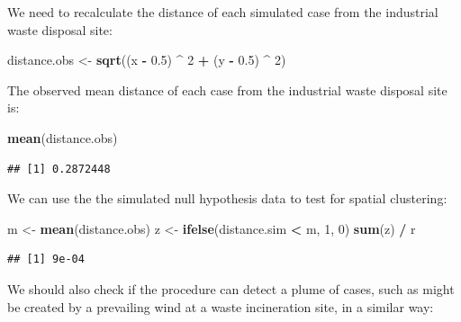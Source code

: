 \documentclass[12pt,a4paper]{book}
\newenvironment{Shaded}{\begin{snugshade}}{\end{snugshade}}
\newcommand{\DecValTok}[1]{\textcolor[rgb]{0.00,0.00,0.81}{#1}}
\newcommand{\FloatTok}[1]{\textcolor[rgb]{0.00,0.00,0.81}{#1}}
\newcommand{\KeywordTok}[1]{\textcolor[rgb]{0.13,0.29,0.53}{\textbf{#1}}}
\newcommand{\NormalTok}[1]{#1}
\newcommand{\OperatorTok}[1]{\textcolor[rgb]{0.81,0.36,0.00}{\textbf{#1}}}
\newcommand{\StringTok}[1]{\textcolor[rgb]{0.31,0.60,0.02}{#1}}
\theoremstyle{definition}
\theoremstyle{definition}
\theoremstyle{definition}
\theoremstyle{remark}
\begin{document}
We need to recalculate the distance of each simulated case from the
industrial waste disposal site:

\begin{Shaded}
\begin{Highlighting}[]
\NormalTok{distance.obs <-}\StringTok{ }\KeywordTok{sqrt}\NormalTok{((x }\OperatorTok{-}\StringTok{ }\FloatTok{0.5}\NormalTok{) }\OperatorTok{^}\StringTok{ }\DecValTok{2} \OperatorTok{+}\StringTok{ }\NormalTok{(y }\OperatorTok{-}\StringTok{ }\FloatTok{0.5}\NormalTok{) }\OperatorTok{^}\StringTok{ }\DecValTok{2}\NormalTok{)}
\end{Highlighting}
\end{Shaded}

The observed mean distance of each case from the industrial waste
disposal site is:

\begin{Shaded}
\begin{Highlighting}[]
\KeywordTok{mean}\NormalTok{(distance.obs)}
\end{Highlighting}
\end{Shaded}

\begin{verbatim}
## [1] 0.2872448
\end{verbatim}

We can use the the simulated null hypothesis data to test for spatial
clustering:

\begin{Shaded}
\begin{Highlighting}[]
\NormalTok{m <-}\StringTok{ }\KeywordTok{mean}\NormalTok{(distance.obs)}
\NormalTok{z <-}\StringTok{ }\KeywordTok{ifelse}\NormalTok{(distance.sim }\OperatorTok{<}\StringTok{ }\NormalTok{m, }\DecValTok{1}\NormalTok{, }\DecValTok{0}\NormalTok{)}
\KeywordTok{sum}\NormalTok{(z) }\OperatorTok{/}\StringTok{ }\NormalTok{r}
\end{Highlighting}
\end{Shaded}

\begin{verbatim}
## [1] 9e-04
\end{verbatim}

We should also check if the procedure can detect a plume of cases, such
as might be created by a prevailing wind at a waste incineration site,
in a similar way:
\end{document}
